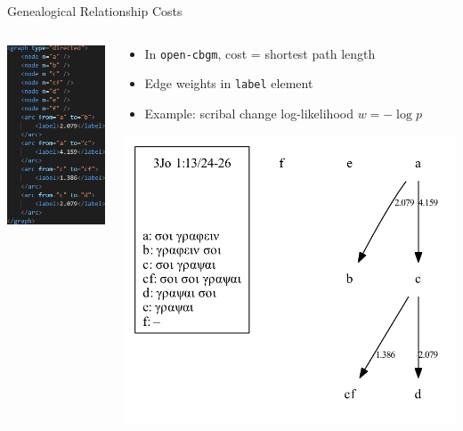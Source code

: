 \documentclass[10pt]{beamer}
\begin{document}
	\begin{frame}{Genealogical Relationship Costs}
		\begin{columns}
			\begin{column}{0.4\textwidth}
				\includegraphics[scale=0.6667]{../graphics/B25K1V13U24-26-local-stemma-weighted-xml.png}
			\end{column}
			\begin{column}{0.55\textwidth}
				\begin{itemize}
					\item In \texttt{open-cbgm}, cost = shortest path length
					\item Edge weights in \texttt{label} element 
					\item Example: scribal change log-likelihood $w = -\log p$
				\end{itemize}
				\includegraphics[width=\textwidth]{../graphics/B25K1V13U24-26-local-stemma-weighted.pdf}
			\end{column}
		\end{columns}
	\end{frame}
\end{document}
